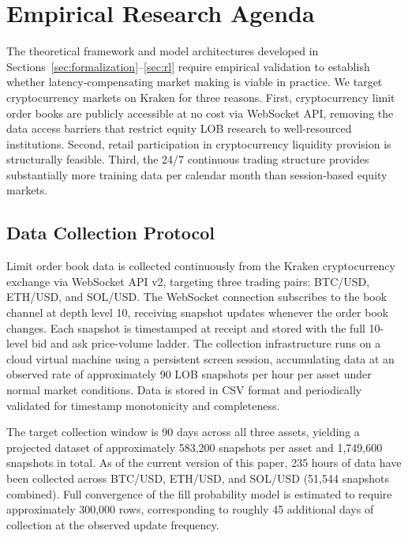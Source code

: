 \documentclass[12pt]{article}
\begin{document}
\section{Empirical Research Agenda}
\label{sec:empirical}

The theoretical framework and model architectures developed in Sections~\ref{sec:formalization}--\ref{sec:rl} require empirical validation to establish whether latency-compensating market making is viable in practice. We target cryptocurrency markets on Kraken for three reasons. First, cryptocurrency limit order books are publicly accessible at no cost via WebSocket API, removing the data access barriers that restrict equity LOB research to well-resourced institutions. Second, retail participation in cryptocurrency liquidity provision is structurally feasible. Third, the 24/7 continuous trading structure provides substantially more training data per calendar month than session-based equity markets.

\subsection{Data Collection Protocol}

Limit order book data is collected continuously from the Kraken cryptocurrency exchange via WebSocket API v2, targeting three trading pairs: BTC/USD, ETH/USD, and SOL/USD. The WebSocket connection subscribes to the book channel at depth level 10, receiving snapshot updates whenever the order book changes. Each snapshot is timestamped at receipt and stored with the full 10-level bid and ask price-volume ladder. The collection infrastructure runs on a cloud virtual machine using a persistent screen session, accumulating data at an observed rate of approximately 90 LOB snapshots per hour per asset under normal market conditions. Data is stored in CSV format and periodically validated for timestamp monotonicity and completeness.

The target collection window is 90 days across all three assets, yielding a projected dataset of approximately 583,200 snapshots per asset and 1,749,600 snapshots in total. As of the current version of this paper, 235 hours of data have been collected across BTC/USD, ETH/USD, and SOL/USD (51,544 snapshots combined). Full convergence of the fill probability model is estimated to require approximately 300,000 rows, corresponding to roughly 45 additional days of collection at the observed update frequency.
\end{document}
